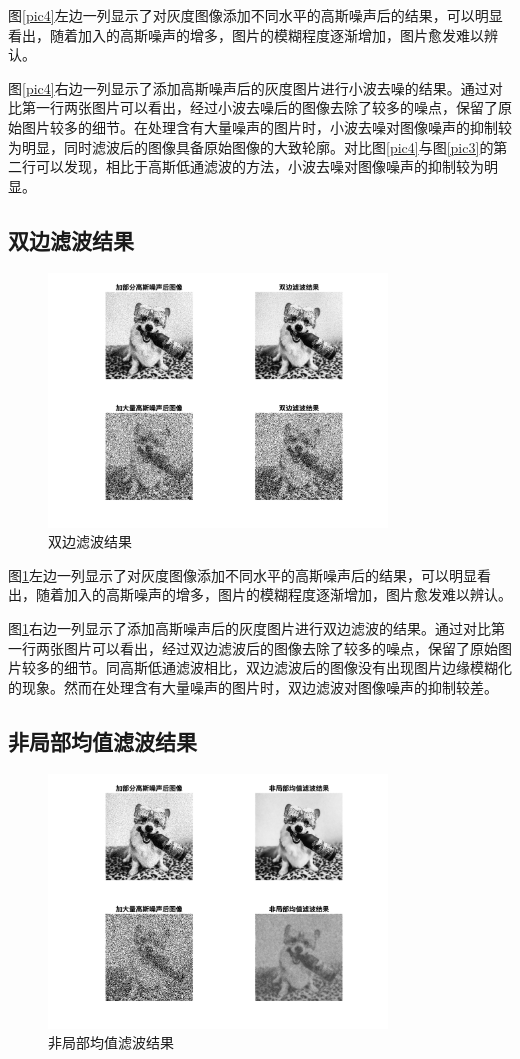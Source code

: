 \documentclass[conference]{IEEEtran}
\begin{document}
图\ref{pic4}左边一列显示了对灰度图像添加不同水平的高斯噪声后的结果，可以明显看出，随着加入的高斯噪声的增多，图片的模糊程度逐渐增加，图片愈发难以辨认。

图\ref{pic4}右边一列显示了添加高斯噪声后的灰度图片进行小波去噪\cite{b3}的结果。通过对比第一行两张图片可以看出，经过小波去噪后的图像去除了较多的噪点，保留了原始图片较多的细节。在处理含有大量噪声的图片时，小波去噪对图像噪声的抑制较为明显，同时滤波后的图像具备原始图像的大致轮廓。对比图\ref{pic4}与图\ref{pic3}的第二行可以发现，相比于高斯低通滤波的方法，小波去噪对图像噪声的抑制较为明显。

\subsection{双边滤波结果}
\begin{figure}[htbp]
	\centerline{
		\includegraphics[width=9cm]{DF滤波结果.png} 	
	}
	\caption{双边滤波结果}
	\label{pic5}
\end{figure}

图\ref{pic5}左边一列显示了对灰度图像添加不同水平的高斯噪声后的结果，可以明显看出，随着加入的高斯噪声的增多，图片的模糊程度逐渐增加，图片愈发难以辨认。

图\ref{pic5}右边一列显示了添加高斯噪声后的灰度图片进行双边滤波\cite{b4}的结果。通过对比第一行两张图片可以看出，经过双边滤波后的图像去除了较多的噪点，保留了原始图片较多的细节。同高斯低通滤波相比，双边滤波后的图像没有出现图片边缘模糊化的现象。然而在处理含有大量噪声的图片时，双边滤波对图像噪声的抑制较差。

\subsection{非局部均值滤波结果}
\begin{figure}[htbp]
	\centerline{
		\includegraphics[width=9cm]{NLM滤波结果.png} 	
	}
	\caption{非局部均值滤波结果}
	\label{pic6}
\end{figure}
\end{document}
